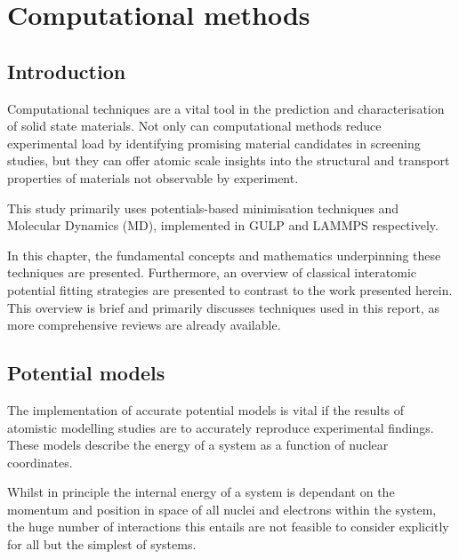 \chapter{Computational methods}
\section{Introduction} %
Computational techniques are a vital tool in the prediction and characterisation of solid state materials.
Not only can computational methods reduce experimental load by identifying promising material candidates in screening studies, but they can offer atomic scale insights into the structural and transport properties of materials not observable by experiment.

This study primarily uses potentials-based minimisation techniques and Molecular Dynamics (MD), implemented in GULP \cite{Gale2003} and LAMMPS \cite{StevePlimton1995} respectively.

In this chapter, the fundamental concepts and mathematics underpinning these techniques are presented.
Furthermore, an overview of classical interatomic potential fitting strategies are presented to contrast to the work presented herein. %
This overview is brief and primarily discusses techniques used in this report, as more comprehensive reviews are already available. \cite{Gale2003, Jensen2007, Catlow2013}

\section{Potential models}
The implementation of accurate potential models is vital if the results of atomistic modelling studies are to accurately reproduce experimental findings.
These models describe the energy of a system as a function of nuclear coordinates.

Whilst in principle the internal energy of a system is dependant on the momentum and position in space of all nuclei and electrons within the system, the huge number of interactions this entails are not feasible to consider explicitly for all but the simplest of systems.

